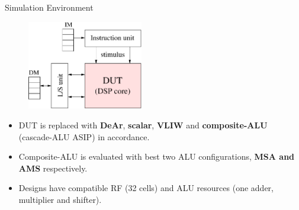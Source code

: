 \documentclass{beamer}
\begin{document}
\begin{CJK}{UTF8}{bkai}
            \begin{frame}{Simulation Environment}
                \begin{figure}[!ht] 
                    \centering
                    \includegraphics[width=0.45\textwidth]{./figs/sim.eps}
                \end{figure}
                \begin{itemize}
                    \item <2->{DUT is replaced with \textbf{DeAr}, \textbf{scalar}, \textbf{VLIW} and \textbf{composite-ALU} (cascade-ALU ASIP) in accordance.}
                    \item <3->{Composite-ALU is evaluated with best two ALU configurations, \textbf{MSA and AMS} respectively.}
                    \item <4->{Designs have compatible RF (32 cells) and ALU resources (one adder, multiplier and shifter).}
                \end{itemize}
            \end{frame}



\end{CJK}
\end{document}
